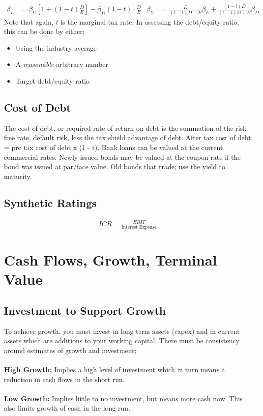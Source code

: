 \documentclass[a4paper]{article}
\begin{document}
\begin{align*}
\beta_L &= \beta_U [1 + (1 - t)\frac{D}{E} ] - \beta_D (1-t) \cdot \frac{D}{E} &
\beta_U &= \frac{E}{(1 - t)D + E}\beta_L + \frac{(1-t)D}{(1-t)D + E}\beta_D
\end{align*}
Note that again, $t$ is the marginal tax rate. In assessing the debt/equity
ratio, this can be done by either;
\begin{itemize}
\item Using the industry average
\item A \emph{reasonable} arbitrary number
\item Target debt/equity ratio
\end{itemize}
\subsection{Cost of Debt}
The cost of debt, or required rate of return on debt is the summation of the
risk free rate, default risk, less the tax shield advantage of debt. After tax
cost of debt = pre tax cost of debt x (1 - t). Bank loans can be valued at the
current commercial rates. Newly issued bonds may be valued at the coupon rate
if the bond was issued at par/face value. Old bonds that trade; use the yield to
maturity.
\subsection{Synthetic Ratings}

\begin{align*}
ICR = \frac{EBIT}{\text{Interest Expense}}
\end{align*}


\section{Cash Flows, Growth, Terminal Value}

\subsection{Investment to Support Growth}
To achieve growth, you must invest in long term assets (capex) and in
current assets which are additions to your working capital. There must be
consistency around estimates of growth and investment;\\\\
%
%
\textbf{High Growth:} Implies a high level of investment which in turn means
a reduction in cash flows in the short run.\\\\
%
%
\textbf{Low Growth:} Implies little to no investment, but means more cash now.
This also limits growth of cash in the long run.
\end{document}
